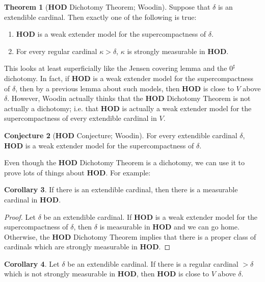 \documentclass[12pt]{report}
\newcommand{\HOD}{\mathbf{HOD}}
\theoremstyle{definition}
\newtheorem{theorem}{Theorem}[chapter]
\newtheorem{corollary}[theorem]{Corollary}
\newtheorem{conjecture}[theorem]{Conjecture}
\begin{document}
\begin{theorem}[$\HOD$ Dichotomy Theorem; Woodin]
Suppose that $\delta$ is an extendible cardinal. Then exactly one of the following is true:
\begin{enumerate}
\item $\HOD$ is a weak extender model for the supercompactness of $\delta$.
\item For every regular cardinal $\kappa > \delta$, $\kappa$ is strongly measurable in $\HOD$.
\end{enumerate}
\end{theorem}
This looks at least superficially like the Jensen covering lemma and the $0^\sharp$ dichotomy.
In fact, if $\HOD$ is a weak extender model for the supercompactness of $\delta$, then by a previous lemma about such models, then $\HOD$ is close to $V$ above $\delta$.
However, Woodin actually thinks that the $\HOD$ Dichotomy Theorem is not actually a dichotomy; i.e. that $\HOD$ is actually a weak extender model for the supercompactness of every extendible cardinal in $V$.
\begin{conjecture}[$\HOD$ Conjecture; Woodin]
For every extendible cardinal $\delta$, $\HOD$ is a weak extender model for the supercompactness of $\delta$.
\end{conjecture}
Even though the $\HOD$ Dichotomy Theorem is a dichotomy, we can use it to prove lots of things about $\HOD$. For example:
\begin{corollary}
If there is an extendible cardinal, then there is a measurable cardinal in $\HOD$.
\end{corollary}
\begin{proof}
Let $\delta$ be an extendible cardinal.
If $\HOD$ is a weak extender model for the supercompactness of $\delta$, then $\delta$ is measurable in $\HOD$ and we can go home.
Otherwise, the $\HOD$ Dichotomy Theorem implies that there is a proper class of cardinals which are strongly measurable in $\HOD$.
\end{proof}
\begin{corollary}
Let $\delta$ be an extendible cardinal. If there is a regular cardinal $> \delta$ which is not strongly measurable in $\HOD$, then $\HOD$ is close to $V$ above $\delta$.
\end{corollary}
\end{document}
